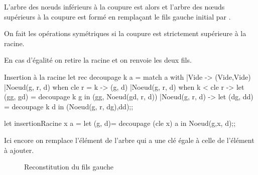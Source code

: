 L'arbre des nœuds inférieurs à la coupure est alors  et l'arbre des nœuds supérieurs à la coupure est formé en remplaçant le fils gauche initial par .

On fait les opérations symétriques si la coupure est strictement supérieure à la racine.

En cas d'égalité on retire la racine et on renvoie les deux fils. 
\begin{code}{Insertion à la racine}
let rec decoupage k a = 
  match a with
  |Vide -> (Vide,Vide)
  |Noeud(g, r, d) when cle r = k -> (g, d)
  |Noeud(g, r, d) when k < cle r
                  -> let (gg, gd) = decoupage k g 
                      in (gg, Noeud(gd, r, d))
  |Noeud(g, r, d) -> let (dg, dd) = decoupage k d 
                      in (Noeud(g, r, dg),dd);;
                
let insertionRacine x a =
  let (g, d)= decoupage (cle x) a 
  in Noeud(g,x, d);;
\end{code}
Ici encore on remplace l'élément de l'arbre qui a une clé égale à celle de l'élément à ajouter.
\begin{figure*}[h]
\centering
{}
\caption{Séparation de l'arbre $a_0$ par la clé 17}
\bigskip
\caption{Reconstitution du fils gauche}
\end{figure*}
